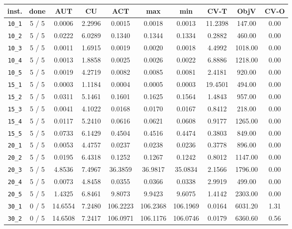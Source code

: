 \begin{table}[h!]
\begin{center}
\small
\begin{tabular}{| c | c | c | c | c | c | c | c | c | c |}
\hline
inst. & done & AUT & CU & ACT & max & min & CV-T & ObjV & CV-O \\
\hline
\verb|10_1| & 5 / 5 & 0.0006 & 2.2996 & 0.0015 & 0.0018 & 0.0013 & 11.2398 & 147.00 & 0.00\\ 
\verb|10_2| & 5 / 5 & 0.0222 & 6.0289 & 0.1340 & 0.1344 & 0.1334 & 0.2882 & 460.00 & 0.00\\ 
\verb|10_3| & 5 / 5 & 0.0011 & 1.6915 & 0.0019 & 0.0020 & 0.0018 & 4.4992 & 1018.00 & 0.00\\ 
\verb|10_4| & 5 / 5 & 0.0013 & 1.8858 & 0.0025 & 0.0026 & 0.0022 & 6.8886 & 1218.00 & 0.00\\ 
\verb|10_5| & 5 / 5 & 0.0019 & 4.2719 & 0.0082 & 0.0085 & 0.0081 & 2.4181 & 920.00 & 0.00\\ 
\verb|15_1| & 5 / 5 & 0.0003 & 1.1184 & 0.0004 & 0.0005 & 0.0003 & 19.4501 & 494.00 & 0.00\\ 
\verb|15_2| & 5 / 5 & 0.0311 & 5.1461 & 0.1601 & 0.1625 & 0.1564 & 1.4843 & 957.00 & 0.00\\ 
\verb|15_3| & 5 / 5 & 0.0041 & 4.1022 & 0.0168 & 0.0170 & 0.0167 & 0.8412 & 218.00 & 0.00\\ 
\verb|15_4| & 5 / 5 & 0.0117 & 5.2410 & 0.0616 & 0.0621 & 0.0608 & 0.9177 & 1265.00 & 0.00\\ 
\verb|15_5| & 5 / 5 & 0.0733 & 6.1429 & 0.4504 & 0.4516 & 0.4474 & 0.3803 & 849.00 & 0.00\\ 
\verb|20_1| & 5 / 5 & 0.0053 & 4.4757 & 0.0237 & 0.0238 & 0.0236 & 0.3778 & 896.00 & 0.00\\ 
\verb|20_2| & 5 / 5 & 0.0195 & 6.4318 & 0.1252 & 0.1267 & 0.1242 & 0.8012 & 1147.00 & 0.00\\ 
\verb|20_3| & 5 / 5 & 4.8536 & 7.4967 & 36.3859 & 36.9817 & 35.0834 & 2.1566 & 1796.00 & 0.00\\ 
\verb|20_4| & 5 / 5 & 0.0073 & 4.8458 & 0.0355 & 0.0366 & 0.0338 & 2.9919 & 499.00 & 0.00\\ 
\verb|20_5| & 5 / 5 & 1.4325 & 6.8461 & 9.8073 & 9.9423 & 9.6075 & 1.4142 & 2303.00 & 0.00\\ 
\verb|30_1| & 0 / 5 & 14.6554 & 7.2480 & 106.2223 & 106.2368 & 106.1969 & 0.0164 & 6031.20 & 1.31\\ 
\verb|30_2| & 0 / 5 & 14.6508 & 7.2417 & 106.0971 & 106.1176 & 106.0746 & 0.0179 & 6360.60 & 0.56\\ 

\end{tabular}
\end{center}
\end{table}
